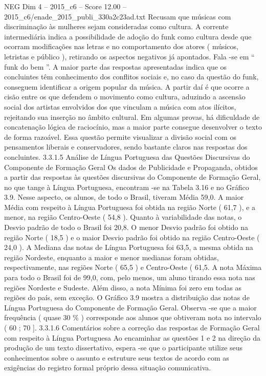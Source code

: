 \begin{textsample}{NEG Dim 4 – 2015\_c6 – Score 12.00 – 2015\_c6/enade\_2015\_publi\_330a2c23ad.txt}
Recusam que músicas com discriminação às mulheres sejam consideradas como cultura.
A corrente intermediária indica a possibilidade de adoção do funk como cultura desde que ocorram modificações nas letras e no comportamento dos atores ( músicos, letristas e público ), retirando os aspectos negativos já apontados.
Fala -se em “ funk do bem ”.
A maior parte das respostas apresentadas indica que os concluintes têm conhecimento dos conflitos sociais e, no caso da questão do funk, conseguem identificar a origem popular da música.
A partir daí é que ocorre a cisão entre os que defendem o movimento como cultura, aduzindo a ascensão social dos artistas envolvidos dos que vinculam a música com atos ilícitos, rejeitando sua inserção no âmbito cultural.
Em algumas provas, há dificuldade de concatenação lógica de raciocínio, mas a maior parte consegue desenvolver o texto de forma razoável.
Essa questão permite visualizar a divisão social com os pensamentos liberais e conservadores, sendo bastante claros nas respostas dos concluintes. 3.3.1.5 Análise de Língua Portuguesa das Questões Discursivas do Componente de Formação Geral Os dados de Publicidade e Propaganda, obtidos a partir das respostas às questões discursivas do Componente de Formação Geral, no que tange à Língua Portuguesa, encontram -se na Tabela 3.16 e no Gráfico 3.9.
Nesse aspecto, os alunos, de todo o Brasil, tiveram Média 59,0.
A maior Média com respeito à Língua Portuguesa foi obtida na região Norte ( 61,7 ), e a menor, na região Centro-Oeste ( 54,8 ).
Quanto à variabilidade das notas, o Desvio padrão de todo o Brasil foi 20,8.
O menor Desvio padrão foi obtido na região Norte ( 18,5 ) e o maior Desvio padrão foi obtido na região Centro-Oeste ( 24,0 ).
A Mediana das notas de Língua Portuguesa foi 63,5, a mesma obtida na região Nordeste, enquanto a maior e menor medianas foram obtidas, respectivamente, nas regiões Norte ( 65,5 ) e Centro-Oeste ( 61,5.
A nota Máxima para todo o Brasil foi de 99,0, com, pelo menos, um aluno tirando essa nota nas regiões Nordeste e Sudeste.
Além disso, a nota Mínima foi zero em todas as regiões do país, sem exceção.
O Gráfico 3.9 mostra a distribuição das notas de Língua Portuguesa do Componente de Formação Geral.
Observa -se que a maior frequência ( quase 30 \% ) corresponde aos alunos que obtiveram nota no intervalo ( 60 ; 70 ]. 3.3.1.6 Comentários sobre a correção das respostas de Formação Geral com respeito à Língua Portuguesa Ao encaminhar as questões 1 e 2 na direção da produção de um texto dissertativo, espera -se que o participante utilize seus conhecimentos sobre o assunto e estruture seus textos de acordo com as exigências do registro formal próprio dessa situação comunicativa.

\end{textsample}
